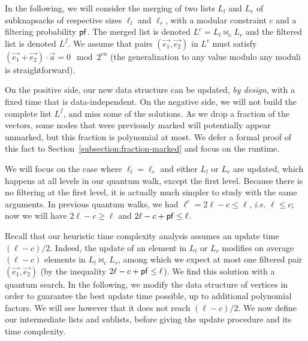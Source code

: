 
In the following, we will consider the merging of two lists $L_l$ and $L_r$ of subknapsacks of respective sizes $\ell_l$ and $\ell_r$, with a modular constraint $c$ and a filtering probability $\mathsf{pf}$. The merged list is denoted $L^c= L_l \bowtie_c L_r$ and the filtered list is denoted $L^f$. We assume that pairs $(\vec{e_1}, \vec{e_2})$ in $L^c$ must satisfy $(\vec{e_1} + \vec{e_2}) \cdot \vec{a} = 0 \mod{2^{cn}}$ (the generalization to any value modulo any moduli is straightforward).

On the positive side, our new data structure can be updated, \emph{by design}, with a fixed time that is data-independent. On the negative side, we will not build the complete list $L^f$, and miss some of the solutions. As we drop a fraction of the vectors, some nodes that were previously marked will potentially appear unmarked, but this fraction is polynomial at most. We defer a formal proof of this fact to Section~\ref{subsection:fraction-marked} and focus on the runtime.

We will focus on the case where $\ell_l = \ell_r$ and either $L_l$ or $L_r$ are updated, which happens at all levels in our quantum walk, except the first level. Because there is no filtering at the first level, it is actually much simpler to study with the same arguments. In previous quantum walks, we had $\ell^c =  2\ell - c \leq \ell$, \emph{i.e.} $\ell \leq c$; now we will have $2\ell - c \geq \ell$ and $2 \ell - c + \mathsf{pf} \leq \ell$.

%
%

Recall that our heuristic time complexity analysis assumes an update time $(\ell-c)/2$. Indeed, the update of an element in $L_l$ or $L_r$ modifies on average $(\ell-c)$ elements in $L_l \bowtie_c L_r$, among which we expect at most one filtered pair $(\vec{e_1}, \vec{e_2})$ (by the inequality $2 \ell - c + \mathsf{pf} \leq \ell$). We find this solution with a quantum search. In the following, we modify the data structure of vertices in order to guarantee the best update time possible, up to additional polynomial factors. We will see however that it does not reach $(\ell-c)/2$. We now define our intermediate lists and sublists, before giving the update procedure and its time complexity.

